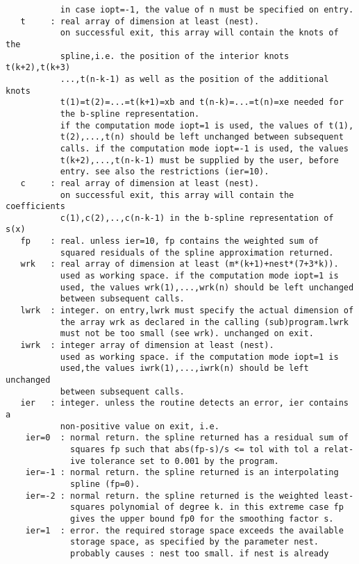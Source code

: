 \begin{verbatim}
           in case iopt=-1, the value of n must be specified on entry.
   t     : real array of dimension at least (nest).
           on successful exit, this array will contain the knots of the
           spline,i.e. the position of the interior knots t(k+2),t(k+3)
           ...,t(n-k-1) as well as the position of the additional knots
           t(1)=t(2)=...=t(k+1)=xb and t(n-k)=...=t(n)=xe needed for
           the b-spline representation.
           if the computation mode iopt=1 is used, the values of t(1),
           t(2),...,t(n) should be left unchanged between subsequent
           calls. if the computation mode iopt=-1 is used, the values
           t(k+2),...,t(n-k-1) must be supplied by the user, before
           entry. see also the restrictions (ier=10).
   c     : real array of dimension at least (nest).
           on successful exit, this array will contain the coefficients
           c(1),c(2),..,c(n-k-1) in the b-spline representation of s(x)
   fp    : real. unless ier=10, fp contains the weighted sum of
           squared residuals of the spline approximation returned.
   wrk   : real array of dimension at least (m*(k+1)+nest*(7+3*k)).
           used as working space. if the computation mode iopt=1 is
           used, the values wrk(1),...,wrk(n) should be left unchanged
           between subsequent calls.
   lwrk  : integer. on entry,lwrk must specify the actual dimension of
           the array wrk as declared in the calling (sub)program.lwrk
           must not be too small (see wrk). unchanged on exit.
   iwrk  : integer array of dimension at least (nest).
           used as working space. if the computation mode iopt=1 is
           used,the values iwrk(1),...,iwrk(n) should be left unchanged
           between subsequent calls.
   ier   : integer. unless the routine detects an error, ier contains a
           non-positive value on exit, i.e.
    ier=0  : normal return. the spline returned has a residual sum of
             squares fp such that abs(fp-s)/s <= tol with tol a relat-
             ive tolerance set to 0.001 by the program.
    ier=-1 : normal return. the spline returned is an interpolating
             spline (fp=0).
    ier=-2 : normal return. the spline returned is the weighted least-
             squares polynomial of degree k. in this extreme case fp
             gives the upper bound fp0 for the smoothing factor s.
    ier=1  : error. the required storage space exceeds the available
             storage space, as specified by the parameter nest.
             probably causes : nest too small. if nest is already

\end{verbatim}
